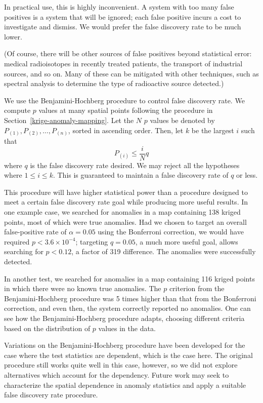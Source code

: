 In practical use, this is highly inconvenient. A system with too many false
positives is a system that will be ignored; each false positive incurs a cost to
investigate and dismiss. We would prefer the false discovery rate to be much
lower.

(Of course, there will be other sources of false positives beyond statistical
error: medical radioisotopes in recently treated patients, the transport of
industrial sources, and so on. Many of these can be mitigated with other
techniques, such as spectral analysis to determine the type of radioactive
source detected.)

We use the Benjamini-Hochberg procedure to control false discovery
rate.\cite{Benjamini:1995ws} We compute \(p\) values at many spatial points
following the procedure in Section~\ref{krige-anomaly-mapping}. Let the \(N\)
\(p\) values be denoted by \(P_{(1)}, P_{(2)}, \ldots, P_{(n)}\), sorted in
ascending order. Then, let \(k\) be the largest \(i\) such that
\begin{equation}
P_{(i)} \leq \frac{i}{N} q
\end{equation}
where \(q\) is the false discovery rate desired. We may reject all the
hypotheses where \(1 \leq i \leq k\). This is guaranteed to maintain a false
discovery rate of \(q\) or less.

This procedure will have higher statistical power than a procedure designed to
meet a certain false discovery rate goal while producing more useful results. In
one example case, we searched for anomalies in a map containing 138 kriged
points, most of which were true anomalies. Had we chosen to target an overall
false-positive rate of \(\alpha = 0.05\) using the Bonferroni correction, we
would have required \(p < 3.6\times 10^{-4}\); targeting \(q=0.05\), a much more
useful goal, allows searching for \(p < 0.12\), a factor of 319 difference. The
anomalies were successfully detected.

In another test, we searched for anomalies in a map containing 116 kriged points
in which there were no known true anomalies. The \(p\) criterion from the
Benjamini-Hochberg procedure was 5 times higher than that from the Bonferroni
correction, and even then, the system correctly reported no anomalies. One can
see how the Benjamini-Hochberg procedure adapts, choosing different criteria
based on the distribution of \(p\) values in the data.

Variations on the Benjamini-Hochberg procedure have been developed for the case
where the test statistics are dependent, which is the case
here.\cite{Benjamini:2001ho} The original procedure still works quite well in
this case, however, so we did not explore alternatives which account for the
dependency. Future work may seek to characterize the spatial dependence in
anomaly statistics and apply a suitable false discovery rate procedure.

